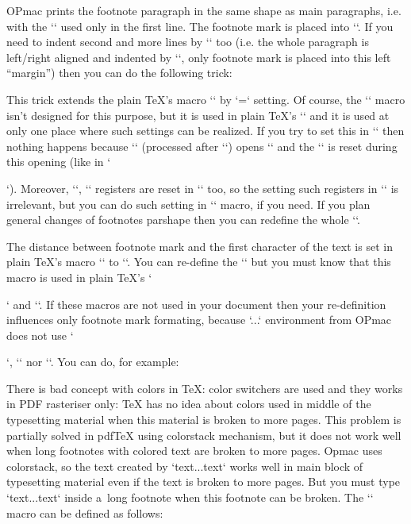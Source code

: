 { 


OPmac prints the footnote paragraph in the same shape as main paragraphs, i.e. with the `\parindent` used only in the first line. The footnote mark is placed into `\parindent`. If you need to indent second and more lines by `\parindent` too (i.e. the whole paragraph is left/right aligned and indented by `\parindent`, only footnote mark is placed into this left “margin”) then you can do the following trick: 

\begtt
\addto\footstrut{\hang} 
\endtt


This trick extends the plain TeX's macro `\footstrut` by `\hangindent=\parindent` setting. Of course, the `\footstrut` macro isn't designed for this purpose, but it is used in plain TeX's `\vfootnote` and it is used at only one place where such settings can be realized. If you try to set this in `\fnotehook` then nothing happens because `\vfootnote` (processed after `\fnotehook`) opens `\insert` and the `\hangindent` is reset during this opening (like in `\par`). Moreover, `\leftskip`, `\rigtskip` registers are reset in `\vfootnote` too, so the setting such registers in `\fnotehook` is irrelevant, but you can do such setting in `\footstrut` macro, if you need. If you plan general changes of footnotes parshape then you can redefine the whole `\vfootnote`. 



The distance between footnote mark and the first character of the text is set in plain TeX's macro `\texindent` to `\enspace`. You can re-define the `\textindent` but you must know that this macro is used in plain TeX's `\item` and `\itemitem`. If these macros are not used in your document then your re-definition influences only footnote mark formating, because `\begitems...\enditems` environment from OPmac does not use `\item`, `\itemitem` nor `\texindent`. You can do, for example: 

\begtt
\def\texindent#1{\indent\llap{#1\kern3pt}} 
\endtt

 


There is bad concept with colors in TeX: color switchers are used and they works in PDF rasteriser only: TeX has no idea about colors used in middle of the typesetting material when this material is broken to more pages. This problem is partially solved in pdfTeX using colorstack mechanism, but it does not work well when long footnotes with colored text are broken to more pages. Opmac uses colorstack, so the text created by `{\localcolor\Red text...text}` works well in main block of typesetting material even if the text is broken to more pages. But you must type `{\fnotecolor\Red text...text}` inside a~long footnote when this footnote can be broken. The `\fnotecolor` macro can be defined as follows: 

}
